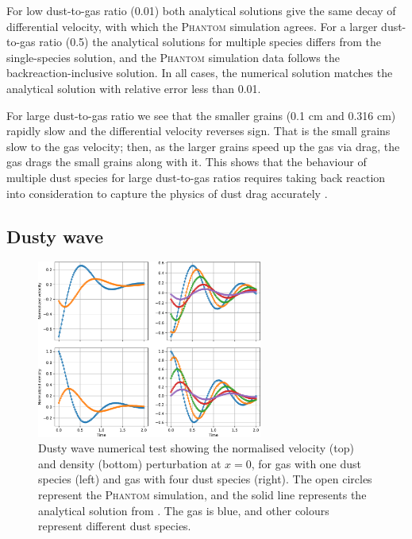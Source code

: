 \documentclass[fleqn,usenatbib]{mnras}
\begin{document}
For low dust-to-gas ratio (0.01) both analytical solutions give the same decay
of differential velocity, with which the \textsc{Phantom} simulation agrees. For
a larger dust-to-gas ratio (0.5) the analytical solutions for multiple species
differs from the single-species solution, and the \textsc{Phantom} simulation
data follows the backreaction-inclusive solution. In all cases, the numerical
solution matches the analytical solution with relative error less than 0.01.

For large dust-to-gas ratio we see that the smaller grains (0.1 cm and 0.316 cm)
rapidly slow and the differential velocity reverses sign. That is the small
grains slow to the gas velocity; then, as the larger grains speed up the gas via
drag, the gas drags the small grains along with it. This shows that the
behaviour of multiple dust species for large dust-to-gas ratios requires taking
back reaction into consideration to capture the physics of dust drag accurately
\citep{Gonzalez2017MNRAS.467.1984G,Dipierro2018MNRAS.479.4187D}.

\subsection{Dusty wave}%
\label{subsec:wave}

\begin{figure}
   \begin{center}
      \includegraphics[width=0.66\textwidth]{figs/dustywave_velocity_density.pdf}
      \caption{Dusty wave numerical test showing the normalised velocity (top)
         and density (bottom) perturbation at \(x = 0\), for gas with one dust
         species (left) and gas with four dust species (right). The open circles
         represent the \textsc{Phantom} simulation, and the solid line
         represents the analytical solution from
         \citet{Benitez-Llambay2019ApJS..241...25B}. The gas is blue, and other
         colours represent different dust species.%
         \label{fig:dustywave}}
   \end{center}
\end{figure}
\end{document}

